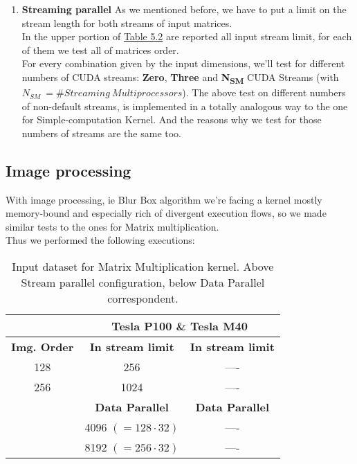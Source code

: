 \begin{enumerate}
	\item \textbf{Streaming parallel}
	As we mentioned before, we have to put a limit on the stream length for both streams of input matrices.\\
	In the upper portion of \hyperref[tab:matdata]{Table 5.2} are reported all input stream limit, for each of them we test all of matrices order.\\
	For every combination given by the input dimensions, we'll test for different numbers of CUDA streams: \textbf{Zero}, \textbf{Three} and \textbf{N\textsubscript{SM}} CUDA Streams (with \(N_{SM} \ =\# Streaming \ Multiprocessors\)).
	The above test on different numbers of non-default streams, is implemented in a totally analogous way to the one for Simple-computation Kernel. And the reasons why we test for those numbers of streams are the same too.
\end{enumerate}

\subsection{Image processing}
With image processing, ie Blur Box algorithm we're facing a kernel mostly memory-bound and especially rich of divergent execution flows, so we made similar tests to the ones for Matrix multiplication.\\
Thus we performed the following executions:


\begin{table}	
	\centering
	\begin{tabular}{| c | c | c |} 
		\hline
		
		 & \multicolumn{2}{c}{\textbf{Tesla P100} \& \textbf{Tesla M40}} \\ [0.5ex]
		\hline\hline
		
		\textbf{Img. Order} & \textbf{In stream limit} &  \textbf{In stream limit}  \\ 
		\hline
		128 & 256 & ----  \\ 
		\hline		
		256	& 1024 & ----  \\ 
		\hline			
		\hline
			

		& \textbf{Data Parallel} & \textbf{Data Parallel} \\ 
		\hline\hline		
		& 4096 \((=128\cdot32)\) & ---- \\ 
		\hline
		& 8192 \((=256\cdot32)\) & ---- \\  
		\hline
		
		
	\end{tabular}
	\caption{Input dataset for Matrix Multiplication kernel. Above Stream parallel configuration, below Data Parallel correspondent.}	
	\label{tab:imgdata}		
\end{table}

